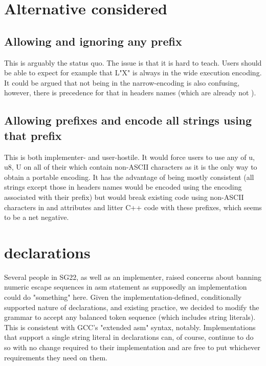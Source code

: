 \documentclass{wg21}
\begin{document}
\section{Alternative considered}

\subsection{Allowing and ignoring any prefix}

This is arguably the status quo.
The issue is that it is hard to teach. Users should be able to expect for example that L"X"
is always in the wide execution encoding.
It could be argued that  not being in the narrow-encoding is also confusing, however, there is precedence for that in headers names (which are already not ).

\subsection{Allowing prefixes and encode all strings using that prefix}

This is both implementer- and user-hostile. It would force users to use any of u, u8, U
on all of their  which contain non-ASCII characters as it is the only way to obtain a portable encoding.
It has the advantage of being mostly consistent (all strings except those in headers names would be encoded using the encoding associated with their prefix) but would break
existing code using non-ASCII characters in  and attributes and
litter C++ code with these prefixes, which seems to be a net negative.

\section{ declarations}

Several people in SG22, as well as an implementer, raised concerns about banning numeric escape sequences
in asm statement as supposedly an implementation could do "something" here.
Given the implementation-defined, conditionally supported nature of  declarations, and existing practice, we decided to modify the grammar to accept any balanced token sequence (which includes string literals).
This is consistent with GCC's "extended asm" syntax, notably.
Implementations that support a single string literal in  declarations can, of course, continue to do so with no change required to their
implementation and are free to put whichever requirements they need on them.
\end{document}
